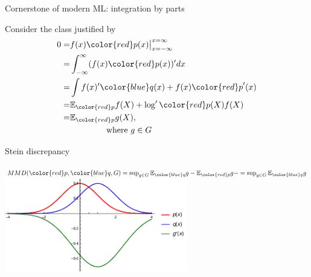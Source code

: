 \documentclass{beamer}
\begin{document}
  \begin{frame}{Cornerstone of modern ML: integration by parts}
  \begin{center}
  Consider the  class   justified by 
\begin{align*}
 0= &  f(x) {\color{red} p}(x)  \big|_{x=-\infty}^{x=\infty} \\
   = &  \int_{-\infty}^{\infty} (f(x) {\color{red} p}(x) )'  dx \\
   = &  \int   f(x)' { \color{blue} q}(x)   + f(x){\color{red} p}'(x)  \\
   = &  \ev_{\color{red} p} f(X)  +  \log' {\color{red} p}(X) f(X) \\
   = & \ev_{\color{red} p} g(X), \\
    & \quad \quad \quad  \quad  \text{ where } g \in G
\end{align*}
\end{center}

 \end{frame} 
  

 \begin{frame}{Stein discrepancy }
 \begin{center}
 
$MMD({\color{red} p},{ \color{blue} q},G) = \sup_{g\in G} \ev_{{ \color{blue} q}}g - \ev_{{\color{red} p}} g - = \sup_{g \in G} \ev_{{ \color{blue} q}} g $  \\
\vspace{0.5cm}
 \includegraphics[width=0.6\textwidth]{./img/s1.pdf} 
 \end{center}
 \end{frame} 
  
\end{document}
